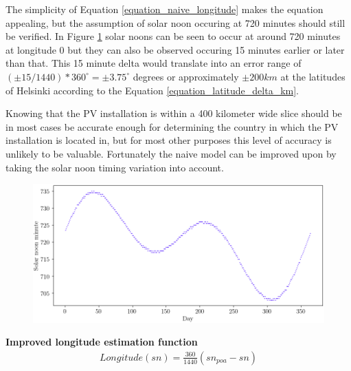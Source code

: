 \hfill \break


\noindent The simplicity of Equation \ref{equation_naive_longitude} makes the equation appealing, but the assumption of solar noon occuring at 720 minutes should still be verified. In Figure \ref{fig_solarnoons} solar noons can be seen to occur at around 720 minutes at longitude 0 but they can also be observed occuring 15 minutes earlier or later than that. This 15 minute delta would translate into an error range of $(\pm 15/1440)*360^\circ = \pm 3.75^\circ$ degrees or approximately $\pm 200 km$ at the latitudes of Helsinki according to the Equation \ref{equation_latitude_delta_km}.


Knowing that the PV installation is within a 400 kilometer wide slice should be in most cases be accurate enough for determining the country in which the PV installation is located in, but for most other purposes this level of accuracy is unlikely to be valuable. Fortunately the naive model can be improved upon by taking the solar noon timing variation into account. \hfill \break

\begin{figure}[ht!]
\centering
\includegraphics[width=1\linewidth]{pics/solarnoons2}
\label{fig_solarnoons}
\end{figure}



\newpage
\noindent\textbf{Improved longitude estimation function }
%
\begin{equation}
\begin{split}
\label{equation_longitude_estimation_2}
Longitude(sn)= \frac{360}{1440}(sn_{poa}-sn)
\end{split}
\end{equation}

